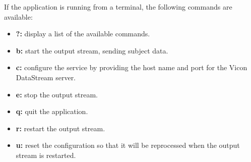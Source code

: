 If the application is running from a terminal, the following commands are available:
\begin{itemize}
\item \textbf{?:} display a list of the available commands.
\item \textbf{b:} start the output stream, sending subject data. 
\item \textbf{c:} configure the service by providing the host name and port for the Vicon
DataStream server. 
\item \textbf{e:} stop the output stream. 
\item \textbf{q:} quit the application. 
\item \textbf{r:} restart the output stream. 
\item \textbf{u:} reset the configuration so that it will be reprocessed when the output
stream is restarted.
\end{itemize}
\primaryEnd{}
